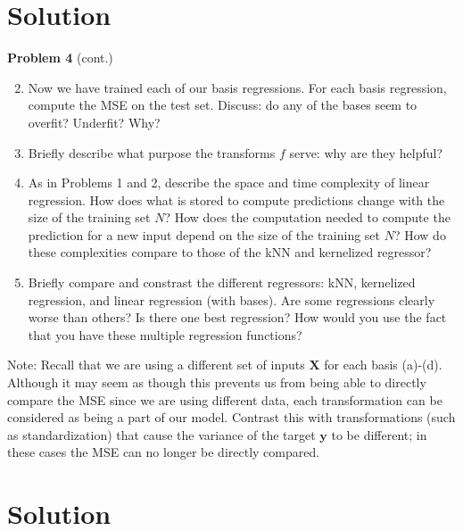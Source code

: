 \documentclass[submit]{harvardml}
\newenvironment{solution}
  {\color{blue}\section*{Solution}}
{}
\begin{document}
\begin{solution}
\newpage
\begin{framed}
\noindent\textbf{Problem 4} (cont.)\\
\begin{enumerate}
\setcounter{enumi}{1}
\item 
Now we have trained each of our basis regressions.  For each basis
regression, compute the MSE on the test set.  Discuss: do any of the
bases seem to overfit?  Underfit?  Why?



\item Briefly describe what purpose the transforms $f$ serve: why are they helpful?

\item As in Problems 1 and 2, describe the space and time complexity of linear regression.  How does what is stored to compute predictions change with the size of the training set $N$?  How does the computation needed to compute the prediction for a new input depend on the size of the training set $N$?  How do these complexities compare to those of the kNN and kernelized regressor?

\item Briefly compare and constrast the different regressors: kNN,
  kernelized regression, and linear regression (with bases).  Are some
  regressions clearly worse than others?  Is there one best
  regression?  How would you use the fact that you have these multiple
  regression functions?
  
\end{enumerate}
Note:
Recall that we are using a 
different set of inputs $\mathbf{X}$ for each basis (a)-(d). 
Although it may seem as though this prevents us from being able 
to directly compare the MSE since we are using different data, 
each transformation can be considered as being a part of our model. 
Contrast this with transformations (such as standardization) that cause the variance of the target $\mathbf{y}$ to be different; in these cases the
MSE can no longer be directly compared.

\end{framed}

\begin{solution}


\end{solution}
\end{solution}
\end{document}
